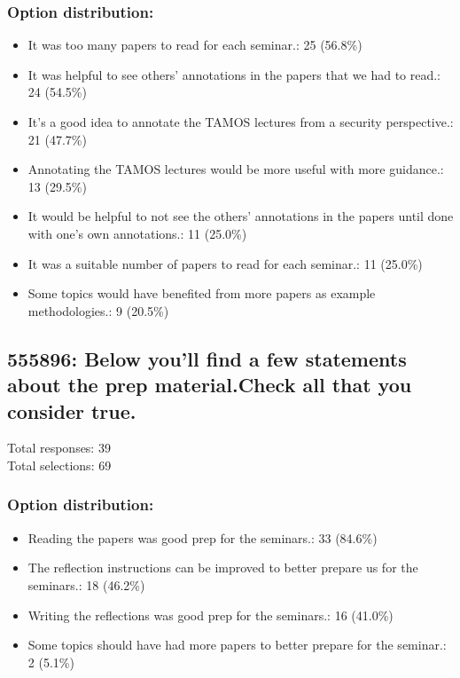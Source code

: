 \documentclass[a4paper]{report}
\begin{document}
\subsubsection{Option distribution:}
\begin{itemize}
  \item It was too many papers to read for each seminar.: 25 (56.8\%)
  \item It was helpful to see others' annotations in the papers that we had to read.: 24 (54.5\%)
  \item It's a good idea to annotate the TAMOS lectures from a security perspective.: 21 (47.7\%)
  \item Annotating the TAMOS lectures would be more useful with more guidance.: 13 (29.5\%)
  \item It would be helpful to not see the others' annotations in the papers until done with one's own annotations.: 11 (25.0\%)
  \item It was a suitable number of papers to read for each seminar.: 11 (25.0\%)
  \item Some topics would have benefited from more papers as example methodologies.: 9 (20.5\%)
\end{itemize}

\subsection{555896: Below you'll find a few statements about the prep material.Check all that you consider true.}

Total responses: 39\\
Total selections: 69\\

\subsubsection{Option distribution:}
\begin{itemize}
  \item Reading the papers was good prep for the seminars.: 33 (84.6\%)
  \item The reflection instructions can be improved to better prepare us for the seminars.: 18 (46.2\%)
  \item Writing the reflections was good prep for the seminars.: 16 (41.0\%)
  \item Some topics should have had more papers to better prepare for the seminar.: 2 (5.1\%)
\end{itemize}
\end{document}
